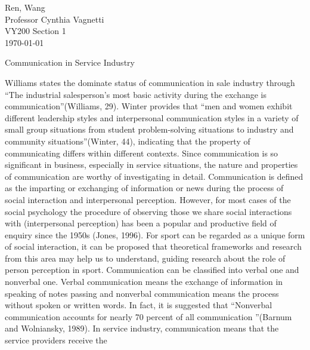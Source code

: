 \documentclass[12pt]{article}
\begin{document}
\begin{flushleft}

Ren, Wang\\
Professor Cynthia Vagnetti \\
VY200 Section 1\\
\today\\


\begin{center}
  Communication in Service Industry
\end{center}


\setlength{\parindent}{0.5in}


Williams states the dominate status of communication in sale industry through
``The industrial salesperson's most basic activity during the exchange is
communication''(Williams, 29). Winter provides that ``men and women exhibit
different leadership styles and interpersonal communication styles in a variety
of small group situations from student problem-solving situations to industry
and community situations''(Winter, 44), indicating that the property of communicating
differs within different contexts.
Since communication is so significant in business, especially in service
situations, the nature and properties of communication are worthy of investigating in detail.
Communication is defined as the imparting or exchanging of information or news
during the process of social interaction and interpersonal perception.
However, for most cases of the social psychology the procedure of observing
those we share social interactions with (interpersonal perception) has been a
popular and productive field of enquiry since the 1950s (Jones, 1996).  
For sport can be regarded as a unique form of social interaction, it can be
proposed that theoretical frameworks and research from this area may help us to
understand, guiding research about the role of person perception in sport. 
Communication can be classified into verbal one and nonverbal one. Verbal
communication means the exchange of information in speaking of notes passing and
nonverbal communication means the process without spoken or written words. In
fact, it is suggested that ``Nonverbal communication accounts for nearly 70 percent
of all communication ''(Barnum and Wolniansky, 1989).
In service industry, communication means that the service providers receive the

\end{flushleft}
\end{document}
